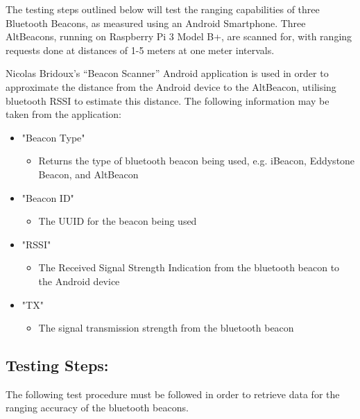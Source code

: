 \documentclass[11pt,a4paper,headinclude=false,footinclude=false]{scrreprt}
\begin{document}
The testing steps outlined below will test the ranging capabilities of
three Bluetooth Beacons, as measured using an Android Smartphone. Three
AltBeacons, running on Raspberry Pi 3 Model B+, are scanned for, with
ranging requests done at distances of 1-5 meters at one meter intervals.

Nicolas Bridoux's ``Beacon Scanner'' Android
application\cite{beaconscan} is used in order to approximate the
distance from the Android device to the AltBeacon, utilising bluetooth
RSSI to estimate this distance. The following information may be taken
from the application:

\begin{itemize}
 \item "Beacon Type"
 \begin{itemize}
  \item Returns the type of bluetooth beacon being used, e.g. iBeacon,
  Eddystone Beacon, and AltBeacon
 \end{itemize}
 \item "Beacon ID"
 \begin{itemize}
  \item The UUID for the beacon being used
 \end{itemize}
 \item "RSSI"
 \begin{itemize}
  \item The Received Signal Strength Indication from the bluetooth beacon to
  the Android device
 \end{itemize}
 \item "TX"
 \begin{itemize}
  \item The signal transmission strength from the bluetooth beacon
 \end{itemize}
\end{itemize}

\subsection{Testing Steps:}\label{testing-steps-1}

The following test procedure must be followed in order to retrieve data
for the ranging accuracy of the bluetooth beacons.
\end{document}
